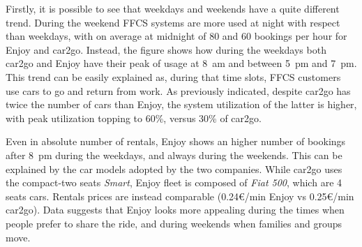 Firstly, it is possible to see that weekdays and weekends have a quite different trend. During the weekend FFCS systems are more used at night with respect than weekdays, with on average at midnight of 80 and 60 bookings per hour for Enjoy and car2go. Instead, the figure shows how during the weekdays both car2go and Enjoy have their peak of usage at 8~am and between 5~pm and 7~pm. This trend can be easily explained as, during that time slots, FFCS customers use cars to go and return from work. 
As previously indicated, despite car2go has twice the number of cars than Enjoy, the system utilization of the latter is higher, with peak utilization topping to 60\%, versus 30\% of car2go. 

Even in absolute number of rentals, Enjoy shows an higher number of bookings after 8~pm during the weekdays, and always during the weekends. This can be explained by the car models adopted by the two companies. While car2go uses the compact-two seats \textit{Smart}, Enjoy fleet is composed of \textit{Fiat 500}, which are 4 seats cars. Rentals prices are instead comparable (0.24\euro/min Enjoy vs 0.25\euro/min car2go). Data suggests that Enjoy looks more appealing during the times when people prefer to share the ride, and during weekends when families and groups move. 